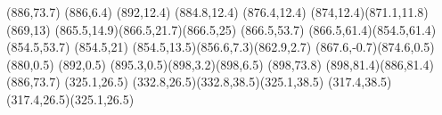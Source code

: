 {
{
\newpath
\moveto(886,73.7)
\lineto(886,6.4)
\lineto(892,12.4)
\lineto(884.8,12.4)
\lineto(876.4,12.4)
\curveto(874,12.4)(871.1,11.8)(869,13)
\curveto(865.5,14.9)(866.5,21.7)(866.5,25)
\lineto(866.5,53.7)
\curveto(866.5,61.4)(854.5,61.4)(854.5,53.7)
\lineto(854.5,21)
\curveto(854.5,13.5)(856.6,7.3)(862.9,2.7)
\curveto(867.6,-0.7)(874.6,0.5)(880,0.5)
\lineto(892,0.5)
\curveto(895.3,0.5)(898,3.2)(898,6.5)
\lineto(898,73.8)
\curveto(898,81.4)(886,81.4)(886,73.7)
}
}
{
{
\newpath
\moveto(325.1,26.5)
\curveto(332.8,26.5)(332.8,38.5)(325.1,38.5)
\curveto(317.4,38.5)(317.4,26.5)(325.1,26.5)
}
}
